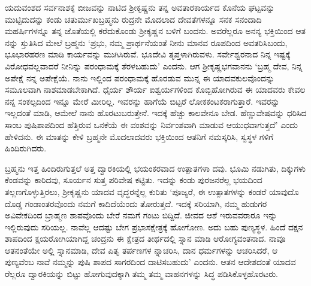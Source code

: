 ಯದುವಂಶದ ಸರ್ವನಾಶಕ್ಕೆ ಬೀಜವನ್ನು ನಾಟಿದ ಶ್ರೀಕೃಷ್ಣನು ತನ್ನ ಅವತಾರಕಾರ್ಯದ ಕೊನೆಯ ಘಟ್ಟವನ್ನು ಮುಟ್ಟಿದುದನ್ನು ಕಂಡು ಚತುರ್ಮುಖಬ್ರಹ್ಮನು ರುದ್ರನೇ ಮೊದಲಾದ ದೇವತೆಗಳನ್ನೂ ಸನಕ ಸನಂದಾದಿ ಮಹರ್ಷಿಗಳನ್ನೂ ತನ್ನ ಜೊತೆಯಲ್ಲಿ ಕರೆದುಕೊಂಡು ಶ್ರೀಕೃಷ್ಣನ ಬಳಿಗೆ ಬಂದನು. ಅವರೆಲ್ಲರೂ ಅನನ್ಯ ಭಕ್ತಿಯಿಂದ ಆತ ನನ್ನು ಸ್ತುತಿಸಿದ ಮೇಲೆ ಬ್ರಹ್ಮನು ‘ಪ್ರಭು, ನಮ್ಮ ಪ್ರಾರ್ಥನೆಯಂತೆ ನೀನು ಮಾನವ ರೂಪದಿಂದ ಅವತರಿಸಿಬಂದು, ಭೂಭಾರಹರಣ ಮಾಡಿ ಕಾರ್ಯವನ್ನು ಮುಗಿಸಿರುವೆ. ಭೂದೇವಿ ತೃಪ್ತಳಾಗಿರುವಳು. ಸರ್ವೇಶ್ವರನಾದ ನಿನ್ನ ಇಷ್ಟಕ್ಕೆ ವಿರೋಧವಲ್ಲವಾದರೆ ನೀನಿನ್ನು ಪರಂಧಾಮಕ್ಕೆ ತೆರಳಬಹುದು’ ಎಂದನು. ಆಗ ಶ್ರೀಕೃಷ್ಣಭಗವಾನನು ‘ಬ್ರಹ್ಮ ದೇವ, ನಿನ್ನ ಅಪೇಕ್ಷೆ ನನ್ನ ಅಪೇಕ್ಷೆಯೆ. ನಾನು ಇಲ್ಲಿಂದ ಪರಂಧಾಮಕ್ಕೆ ಹೊರಡುವ ಮುನ್ನ ಈ ಯಾದವಕುಲವೊಂದನ್ನು ಸಮೂಲವಾಗಿ ನಾಶಮಾಡಬೇಕಾಗಿದೆ. ಧೈರ್ಯ ಶೌರ್ಯ ಐಶ್ವರ್ಯಗಳಿಂದ ಕೊಬ್ಬಿಹೋಗಿರುವ ಈ ಯಾದವರು ಕೇವಲ ನನ್ನ ಸಂಕಲ್ಪದಿಂದ ಇನ್ನೂ ಮೇರೆ ಮೀರಿಲ್ಲ. ಇವರನ್ನು ಹಾಗೆಯೆ ಬಿಟ್ಟರೆ ಲೋಕಕಂಟಕರಾಗುತ್ತಾರೆ. ಇವರನ್ನು ಇಲ್ಲದಂತೆ ಮಾಡಿ, ಆಮೇಲೆ ನಾನು ಹೊರಟುಬರುತ್ತೇನೆ. ಇದಕ್ಕೆ ಹೆಚ್ಚು ಕಾಲವೇನೂ ಬೇಡ. ಹೆಣ್ಣುವೇಷವನ್ನು ಧರಿಸಿದ ಸಾಂಬ ಪುಷಿಶಾಪದಿಂದ ಹೆತ್ತಿರುವ ಒನಕೆಯೆ ಈ ವಂಶವನ್ನು ನಿರ್ವಂಶವಾಗಿ ಮಾಡುವ ಆಯುಧವಾಗುತ್ತದೆ’ ಎಂದು ಹೇಳಿದನು. ಈ ಮಾತನ್ನು ಕೇಳಿ ಬ್ರಹ್ಮನೇ ಮೊದಲಾದವರು ಭಕ್ತಿಯಿಂದ ಆತನಿಗೆ ನಮಸ್ಕರಿಸಿ, ಸ್ವಸ್ಥಳ ಗಳಿಗೆ ಹಿಂದಿರುಗಿದರು.

ಬ್ರಹ್ಮನು ಇತ್ತ ಹಿಂದಿರುಗುತ್ತಲೆ ಅತ್ತ ದ್ವಾರಕಿಯಲ್ಲಿ ಭಯಂಕರವಾದ ಉತ್ಪಾತಗಳಾ ದವು. ಭೂಮಿ ನಡುಗಿತು, ದಿಕ್ಕುಗಳು ಕೆಂಡವನ್ನು ಕಾರಿದವು, ಸೂರ್ಯನ ಸುತ್ತ ಪರಿವೇಷ ಕಟ್ಟಿತು. ಇದನ್ನು ಕಂಡು ಪುರಜನರೆಲ್ಲ ಭಯದಿಂದ ತಲ್ಲಣಗೊಳ್ಳುತ್ತಿರಲು, ಶ್ರೀಕೃಷ್ಣನು ಯಾದವ ವೃದ್ಧರನ್ನೆಲ್ಲ ಕುರಿತು ‘ಪೂಜ್ಯರೆ, ಈ ಉತ್ಪಾತಗಳನ್ನು ಕಂಡರೆ ಯಾವುದೊ ದೊಡ್ಡ ಗಂಡಾಂತರವೊಂದು ನಮಗೆ ಕಾದಿದೆಯೆಂದು ತೋರುತ್ತದೆ. ಇದಕ್ಕೆ ಸರಿಯಾಗಿ, ನಮ್ಮ ಹುಡುಗರ ಅವಿವೇಕದಿಂದ ಬ್ರಾಹ್ಮಣ ಶಾಪವೊಂದು ಬೇರೆ ನಮಗೆ ಗಂಟು ಬಿದ್ದಿದೆ. ಜೀವದ ಆಶೆ ಇರುವವರಾರೂ ಇನ್ನು ಇಲ್ಲಿರುವುದು ಸರಿಯಲ್ಲ. ನಾವೆಲ್ಲ ಆದಷ್ಟು ಬೇಗ ಪ್ರಭಾಸಕ್ಷೇತ್ರಕ್ಕೆ ಹೋಗೋಣ. ಅದು ಬಹು ಪುಣ್ಯಸ್ಥಳ. ಹಿಂದೆ ದಕ್ಷನ ಶಾಪದಿಂದ ಕ್ಷಯರೋಗಿಯಾಗಿದ್ದ ಚಂದ್ರನು ಈ ಕ್ಷೇತ್ರದ ತೀರ್ಥದಲ್ಲಿ ಸ್ನಾನ ಮಾಡಿ ಆರೋಗ್ಯವಂತನಾದ. ನಾವೂ ಆತನಂತೆಯೇ ಅಲ್ಲಿ ಸ್ನಾನಮಾಡಿ, ದೇವ ಪಿತೃ ತರ್ಪಣಗಳ ನ್ನಾಚರಿಸಿ, ದಾನ ಧರ್ಮಗಳನ್ನು ಆಚರಿಸಿದರೆ, ಆ ಪುಣ್ಯವೆಂಬ ನಾವೆ ನಮ್ಮನ್ನು ಪುಷಿ ಶಾಪದ ಸಾಗರದಿಂದ ದಾಟಿಸಬಹುದು’ ಎಂದನು. ಆತನ ಆದೇಶದಂತೆ ಯಾದವ ರೆಲ್ಲರೂ ದ್ವಾರಕಿಯನ್ನು ಬಿಟ್ಟು ಹೋಗುವುದಕ್ಕಾಗಿ ತಮ್ಮ ತಮ್ಮ ವಾಹನಗಳನ್ನು ಸಿದ್ಧ ಪಡಿಸಿಕೊಳ್ಳಹೊರಟರು.


